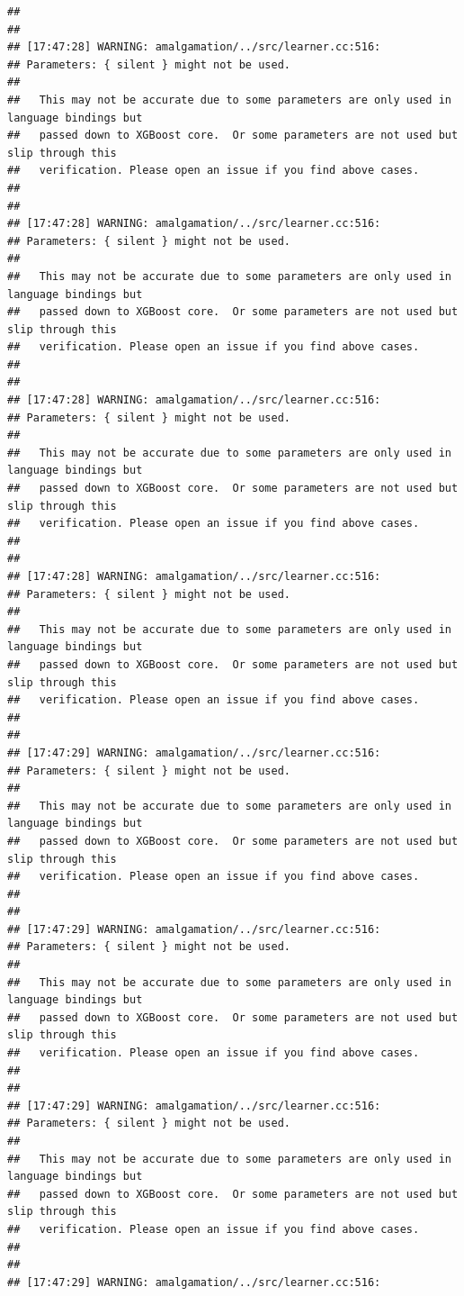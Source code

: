 \documentclass[AMS,STIX2COL]{WileyNJD-v2}\usepackage[]{graphicx}\usepackage[]{color}
\makeatletter
\newenvironment{kframe}{%
 \def\at@end@of@kframe{}%
 \ifinner\ifhmode%
  \def\at@end@of@kframe{\end{minipage}}%
  \begin{minipage}{\columnwidth}%
 \fi\fi%
 \def\FrameCommand##1{\hskip\@totalleftmargin \hskip-\fboxsep
 \colorbox{shadecolor}{##1}\hskip-\fboxsep
     \hskip-\linewidth \hskip-\@totalleftmargin \hskip\columnwidth}%
 \MakeFramed {\advance\hsize-\width
   \@totalleftmargin\z@ \linewidth\hsize
   \@setminipage}}%
 {\par\unskip\endMakeFramed%
 \at@end@of@kframe}
\newenvironment{knitrout}{}{} %
\makeatother
\begin{document}
\begin{knitrout}
\begin{kframe}
\begin{verbatim}
## 
## 
## [17:47:28] WARNING: amalgamation/../src/learner.cc:516: 
## Parameters: { silent } might not be used.
## 
##   This may not be accurate due to some parameters are only used in language bindings but
##   passed down to XGBoost core.  Or some parameters are not used but slip through this
##   verification. Please open an issue if you find above cases.
## 
## 
## [17:47:28] WARNING: amalgamation/../src/learner.cc:516: 
## Parameters: { silent } might not be used.
## 
##   This may not be accurate due to some parameters are only used in language bindings but
##   passed down to XGBoost core.  Or some parameters are not used but slip through this
##   verification. Please open an issue if you find above cases.
## 
## 
## [17:47:28] WARNING: amalgamation/../src/learner.cc:516: 
## Parameters: { silent } might not be used.
## 
##   This may not be accurate due to some parameters are only used in language bindings but
##   passed down to XGBoost core.  Or some parameters are not used but slip through this
##   verification. Please open an issue if you find above cases.
## 
## 
## [17:47:28] WARNING: amalgamation/../src/learner.cc:516: 
## Parameters: { silent } might not be used.
## 
##   This may not be accurate due to some parameters are only used in language bindings but
##   passed down to XGBoost core.  Or some parameters are not used but slip through this
##   verification. Please open an issue if you find above cases.
## 
## 
## [17:47:29] WARNING: amalgamation/../src/learner.cc:516: 
## Parameters: { silent } might not be used.
## 
##   This may not be accurate due to some parameters are only used in language bindings but
##   passed down to XGBoost core.  Or some parameters are not used but slip through this
##   verification. Please open an issue if you find above cases.
## 
## 
## [17:47:29] WARNING: amalgamation/../src/learner.cc:516: 
## Parameters: { silent } might not be used.
## 
##   This may not be accurate due to some parameters are only used in language bindings but
##   passed down to XGBoost core.  Or some parameters are not used but slip through this
##   verification. Please open an issue if you find above cases.
## 
## 
## [17:47:29] WARNING: amalgamation/../src/learner.cc:516: 
## Parameters: { silent } might not be used.
## 
##   This may not be accurate due to some parameters are only used in language bindings but
##   passed down to XGBoost core.  Or some parameters are not used but slip through this
##   verification. Please open an issue if you find above cases.
## 
## 
## [17:47:29] WARNING: amalgamation/../src/learner.cc:516: 

\end{verbatim}
\end{kframe}
\end{knitrout}
\end{document}
